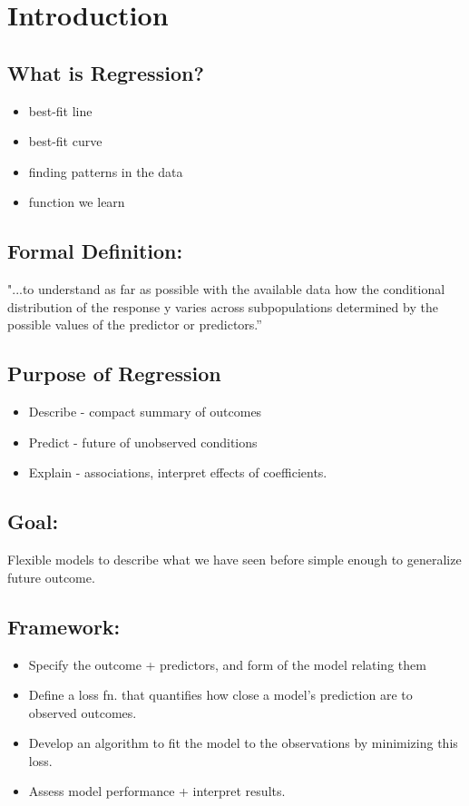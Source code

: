 




\section{Introduction}

\subsection{What is Regression?}
	\begin{itemize}
  	\item best-fit line
  	\item best-fit curve
  	\item finding patterns in the data
  	\item function we learn
	\end{itemize}



\subsection{Formal Definition:} "...to understand as far as possible with the available data how the conditional distribution of the response y varies across subpopulations determined by the possible values of the predictor or predictors.'' 

\subsection{Purpose of Regression}
\begin{itemize}
  \item Describe - compact summary of outcomes
  \item Predict - future of unobserved conditions
  \item Explain - associations, interpret effects of coefficients.
\end{itemize}

\subsection{Goal:} Flexible models to describe what we have seen before simple enough to generalize future outcome.

\subsection{Framework: } 
\begin{itemize}
  \item Specify the outcome + predictors, and form of the model  relating them
  \item Define a loss fn. that quantifies how close a model's prediction are to observed outcomes.
  \item Develop an algorithm to fit the model to the observations by minimizing this loss.
  \item Assess model performance + interpret results.
\end{itemize}


